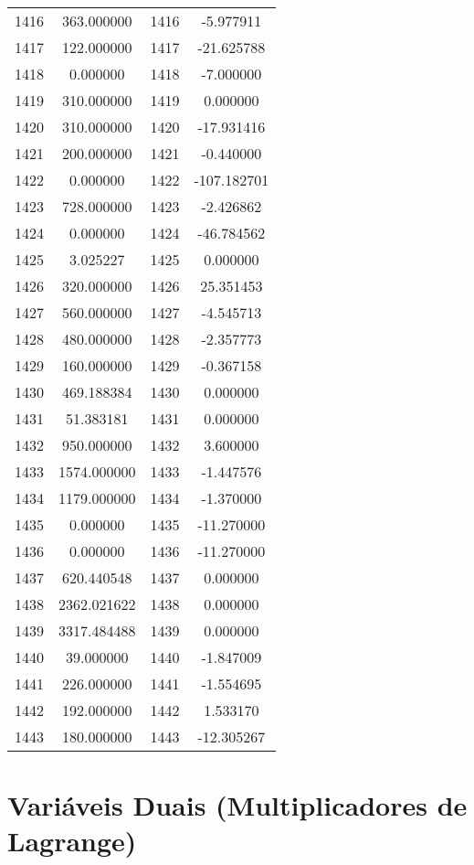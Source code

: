 \documentclass[12pt]{article}
\begin{document}
\begin{longtable}{@{}cccc@{}}
1416 & 363.000000 & 1416 & -5.977911 \\
1417 & 122.000000 & 1417 & -21.625788 \\
1418 & 0.000000 & 1418 & -7.000000 \\
1419 & 310.000000 & 1419 & 0.000000 \\
1420 & 310.000000 & 1420 & -17.931416 \\
1421 & 200.000000 & 1421 & -0.440000 \\
1422 & 0.000000 & 1422 & -107.182701 \\
1423 & 728.000000 & 1423 & -2.426862 \\
1424 & 0.000000 & 1424 & -46.784562 \\
1425 & 3.025227 & 1425 & 0.000000 \\
1426 & 320.000000 & 1426 & 25.351453 \\
1427 & 560.000000 & 1427 & -4.545713 \\
1428 & 480.000000 & 1428 & -2.357773 \\
1429 & 160.000000 & 1429 & -0.367158 \\
1430 & 469.188384 & 1430 & 0.000000 \\
1431 & 51.383181 & 1431 & 0.000000 \\
1432 & 950.000000 & 1432 & 3.600000 \\
1433 & 1574.000000 & 1433 & -1.447576 \\
1434 & 1179.000000 & 1434 & -1.370000 \\
1435 & 0.000000 & 1435 & -11.270000 \\
1436 & 0.000000 & 1436 & -11.270000 \\
1437 & 620.440548 & 1437 & 0.000000 \\
1438 & 2362.021622 & 1438 & 0.000000 \\
1439 & 3317.484488 & 1439 & 0.000000 \\
1440 & 39.000000 & 1440 & -1.847009 \\
1441 & 226.000000 & 1441 & -1.554695 \\
1442 & 192.000000 & 1442 & 1.533170 \\
1443 & 180.000000 & 1443 & -12.305267 \\

\end{longtable}

\section{Variáveis Duais (Multiplicadores de Lagrange)}
\end{document}
